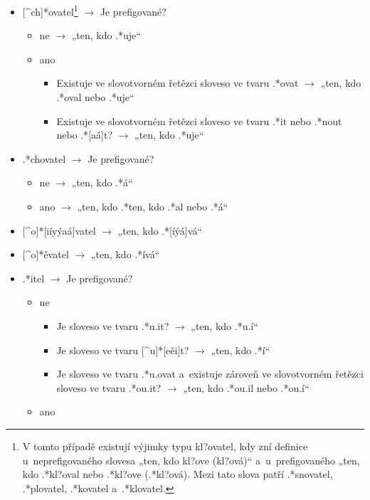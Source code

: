 \begin{itemize}
\tightlist
\item
  {[}\^{}ch{]}*ovatel\footnote{V tomto případě existují výjimky typu kl?ovatel, kdy zní definice u~neprefigovaného slovesa „ten, kdo kl?ove (kl?ová)“ a~u~prefigovaného „ten, kdo .*kl?oval nebo .*kl?ove (.*kl?ová). Mezi tato slova patří .*snovatel, .*plovatel, .*kovatel a~.*klovatel.}
  $\rightarrow$ Je prefigované?

  \begin{itemize}
  \tightlist
  \item
    ne $\rightarrow$ „ten, kdo .*uje``
  \item
    ano

    \begin{itemize}
    \tightlist
    \item
      Existuje ve slovotvorném řetězci sloveso ve tvaru .*ovat
      $\rightarrow$ „ten, kdo .*oval nebo .*uje``
    \item
      Existuje ve slovotvorném řetězci sloveso ve tvaru .*it nebo .*nout
      nebo .*{[}aá{]}t? $\rightarrow$ „ten, kdo .*uje``
    \end{itemize}
  \end{itemize}
\item
  .*chovatel $\rightarrow$ Je prefigované?

  \begin{itemize}
  \tightlist
  \item
    ne $\rightarrow$ „ten, kdo .*á``
  \item
    ano $\rightarrow$ „ten, kdo .*ten, kdo .*al nebo .*á``
  \end{itemize}
\item
  {[}\^{}o{]}*{[}iíyýaá{]}vatel $\rightarrow$ „ten, kdo
  .*{[}íýá{]}vá``
\item
  {[}\^{}o{]}*ěvatel $\rightarrow$ „ten, kdo .*ívá``
\item
  .*itel $\rightarrow$ Je prefigované?

  \begin{itemize}
  \tightlist
  \item
    ne

    \begin{itemize}
    \tightlist
    \item
      Je sloveso ve tvaru .*u.it? $\rightarrow$ „ten, kdo .*u.í``
    \item
      Je sloveso ve tvaru {[}\^{}u{]}*{[}eěi{]}t? $\rightarrow$ „ten,
      kdo .*í``
    \item
      Je sloveso ve tvaru .*u.ovat a~existuje zároveň ve slovotvorném
      řetězci sloveso ve tvaru .*ou.it? $\rightarrow$ „ten, kdo
      .*ou.il nebo .*ou.í``
    \end{itemize}
  \item
    ano


\end{itemize}
\end{itemize}
